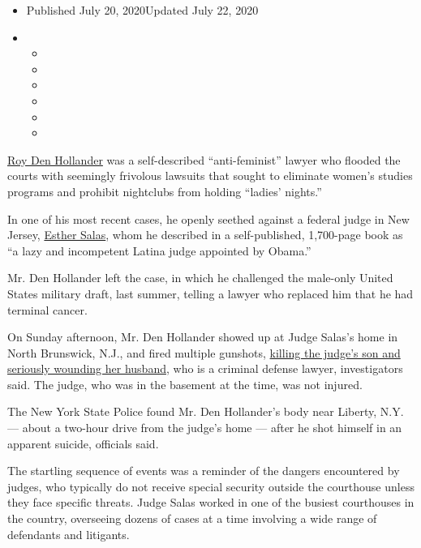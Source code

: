 \begin{itemize}
\item
  Published July 20, 2020Updated July 22, 2020
\item
  \begin{itemize}
  \item
  \item
  \item
  \item
  \item
  \item
  \end{itemize}
\end{itemize}

\href{https://www.nytimes.com/2020/07/22/nyregion/roy-hollander-esther-salas.html}{Roy
Den Hollander} was a self-described ``anti-feminist'' lawyer who flooded
the courts with seemingly frivolous lawsuits that sought to eliminate
women's studies programs and prohibit nightclubs from holding ``ladies'
nights.''

In one of his most recent cases, he openly seethed against a federal
judge in New Jersey,
\href{https://www.nytimes.com/2020/07/25/nyregion/roy-den-hollander-esther-salas-list.html}{Esther
Salas}, whom he described in a self-published, 1,700-page book as ``a
lazy and incompetent Latina judge appointed by Obama.''

Mr. Den Hollander left the case, in which he challenged the male-only
United States military draft, last summer, telling a lawyer who replaced
him that he had terminal cancer.

On Sunday afternoon, Mr. Den Hollander showed up at Judge Salas's home
in North Brunswick, N.J., and fired multiple gunshots,
\href{https://www.nytimes.com/2020/07/19/nyregion/shooting-nj-judge-esther-salas.html}{killing
the judge's son and seriously wounding her husband}, who is a criminal
defense lawyer, investigators said. The judge, who was in the basement
at the time, was not injured.

The New York State Police found Mr. Den Hollander's body near Liberty,
N.Y. --- about a two-hour drive from the judge's home --- after he shot
himself in an apparent suicide, officials said.

The startling sequence of events was a reminder of the dangers
encountered by judges, who typically do not receive special security
outside the courthouse unless they face specific threats. Judge Salas
worked in one of the busiest courthouses in the country, overseeing
dozens of cases at a time involving a wide range of defendants and
litigants.

